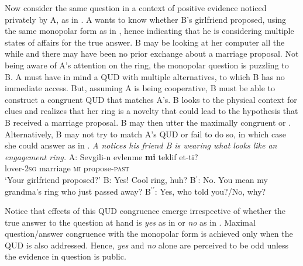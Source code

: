 \documentclass[output=paper,colorlinks,citecolor=brown]{langscibook}
\begin{document}
\largerpage
Now consider the same question in a context of positive evidence noticed privately by A, as in . A wants to know whether B's girlfriend proposed, using the same monopolar form as in , hence indicating that he is considering multiple states of affairs for the true answer. B may be looking at her computer all the while and there may have been no prior exchange about a marriage proposal. Not being aware of A's attention on the ring, the monopolar question is puzzling to B. A must have in mind a QUD with multiple alternatives, to which B has no immediate access. But, assuming A is being cooperative, B must be able to construct a congruent QUD that matches A's. B looks to the physical context for clues and realizes that her ring is a novelty that could lead to the hypothesis that B received a marriage proposal. B may then utter the maximally congruent  or . Alternatively, B may not try to match A's QUD or fail to do so, in which case she could answer as in . 
\ea\label{engagement} \textit{A notices his friend B is wearing what looks like an engagement ring.}
\ea A: \gll Sevgili-n evlenme \textbf{mi} {teklif et-ti}?\\
lover-\textsc{2sg} marriage \textsc{mi} propose-\textsc{past}\\
\glt \phantom{A:} `Your girlfriend proposed?'
\ex \label{engagementB1} B: Yes! Cool ring, huh?
\ex \label{engagementB2} B$^{\prime}$: No. You mean my grandma's ring who just passed away? 
\ex \label{engagementB3} B$^{\prime\prime}$: Yes, who told you?/No, why?
\z
\z

Notice that effects of this QUD congruence emerge irrespective of whether the true answer to the question at hand is \textit{yes} as in  or \textit{no} as in . Maximal question/answer congruence with the monopolar form is achieved only when the QUD is also addressed. Hence, \textit{yes} and \textit{no} alone are perceived to be odd unless the evidence in question is public. 
\end{document}
